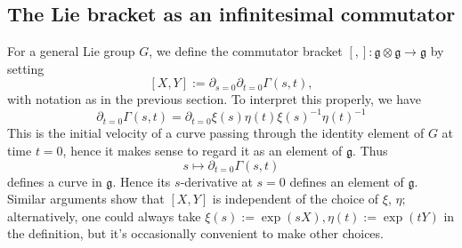 \documentclass[reqno]{amsart} 
\begin{document}
\subsection{The Lie bracket as an infinitesimal commutator}
\label{sec:org166886b}
For a general Lie group $G$,
we define the commutator bracket $[,] : \mathfrak{g}  \otimes
\mathfrak{g} \rightarrow \mathfrak{g}$
by setting
\begin{equation*}
  {}  [X,Y] := \partial_{s=0}
  \partial_{t=0} \Gamma(s,t),
\end{equation*}
with notation as in the previous section.
To interpret this properly,
we have
\begin{equation*}
  \partial_{t=0}
  \Gamma(s,t)
  =
  \partial_{t=0}
  \xi(s)
  \eta(t)
  \xi(s)^{-1}
  \eta(t)^{-1}
\end{equation*}
This is the initial velocity of a curve
passing through the identity element of $G$ at time $t=0$,
hence it makes sense to regard it as an element of
$\mathfrak{g}$.
Thus
\begin{equation*}
  s \mapsto \partial_{t=0} \Gamma(s,t)
\end{equation*}
defines a curve in $\mathfrak{g}$.
Hence its $s$-derivative at $s=0$
defines an element of $\mathfrak{g}$.
Similar arguments show that $[X,Y]$ is independent of the choice of $\xi$,
$\eta$; alternatively, one could always take
$\xi(s) := \exp(s X), \eta(t) := \exp(t Y)$
in the definition, but it's occasionally convenient
to make other choices.
\end{document}
